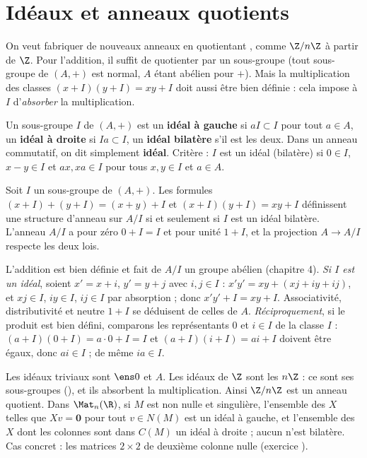 \section{Idéaux et anneaux quotients}
\begin{intuition}
On veut fabriquer de nouveaux anneaux en \og quotientant \fg, comme $\Z/n\Z$ à partir de $\Z$. Pour l'addition, il suffit de quotienter par un sous-groupe (tout sous-groupe de $(A,+)$ est normal, $A$ étant abélien pour $+$). Mais la multiplication des classes $(x+I)(y+I)=xy+I$ doit aussi être bien définie : cela impose à $I$ d'\emph{absorber} la multiplication.
\end{intuition}
\begin{definition}[Idéal]
Un sous-groupe $I$ de $(A,+)$ est un \textbf{idéal à gauche} si $aI\subset I$ pour tout $a\in A$, un \textbf{idéal à droite} si $Ia\subset I$, un \textbf{idéal bilatère} s'il est les deux. Dans un anneau commutatif, on dit simplement \textbf{idéal}. Critère : $I$ est un idéal (bilatère) si $0\in I$, $x-y\in I$ et $ax,xa\in I$ pour tous $x,y\in I$ et $a\in A$.
\end{definition}
\begin{theoreme}\label{thm-anneau-quotient}
Soit $I$ un sous-groupe de $(A,+)$. Les formules $(x+I)+(y+I)=(x+y)+I$ et $(x+I)(y+I)=xy+I$ définissent une structure d'anneau sur $A/I$ si et seulement si $I$ est un idéal bilatère. L'anneau $A/I$ a pour zéro $0+I=I$ et pour unité $1+I$, et la projection $A\to A/I$ respecte les deux lois.
\end{theoreme}
\begin{preuve}
L'addition est bien définie et fait de $A/I$ un groupe abélien (chapitre 4). \emph{Si $I$ est un idéal}, soient $x'=x+i$, $y'=y+j$ avec $i,j\in I$ : $x'y'=xy+(xj+iy+ij)$, et $xj\in I$, $iy\in I$, $ij\in I$ par absorption ; donc $x'y'+I=xy+I$. Associativité, distributivité et neutre $1+I$ se déduisent de celles de $A$. \emph{Réciproquement}, si le produit est bien défini, comparons les représentants $0$ et $i\in I$ de la classe $I$ : $(a+I)(0+I)=a\cdot0+I=I$ et $(a+I)(i+I)=ai+I$ doivent être égaux, donc $ai\in I$ ; de même $ia\in I$.
\end{preuve}
\begin{exemple}
Les idéaux triviaux sont $\ens0$ et $A$. Les idéaux de $\Z$ sont les $n\Z$ : ce sont ses sous-groupes (), et ils absorbent la multiplication. Ainsi $\Z/n\Z$ est un anneau quotient. Dans $\Mat_n(\R)$, si $M$ est non nulle et singulière, l'ensemble des $X$ telles que $Xv=\mathbf 0$ pour tout $v\in N(M)$ est un idéal à gauche, et l'ensemble des $X$ dont les colonnes sont dans $C(M)$ un idéal à droite ; aucun n'est bilatère. Cas concret : les matrices $2\times2$ de deuxième colonne nulle (exercice ).
\end{exemple}
